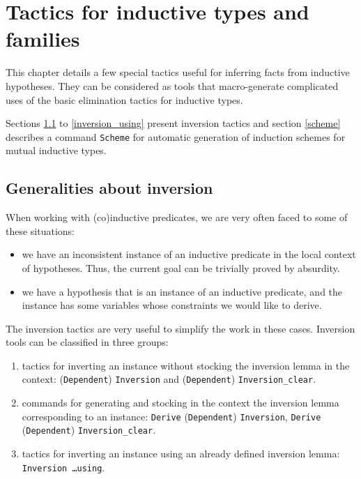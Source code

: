 
%

%

%


\chapter{Tactics for inductive types and families}
\label{Addoc-equality}

This chapter details a few special tactics useful for inferring facts
from inductive hypotheses. They can be considered as tools that
macro-generate complicated uses of the basic elimination tactics for
inductive types. 

Sections \ref{inversion_introduction} to \ref{inversion_using}  present
inversion tactics and section \ref{scheme} describes
a command {\tt Scheme} for automatic generation of induction schemes
for mutual inductive types.

%
%

%

\section{Generalities about inversion}
\label{inversion_introduction}
When working with (co)inductive predicates, we are very often faced to
some of these situations:
\begin{itemize}
\item we have an inconsistent instance of an inductive predicate in the
  local context of hypotheses. Thus, the current goal can be trivially
  proved by absurdity. 

\item we have a hypothesis that is an instance of an inductive
  predicate, and the instance has some variables whose constraints we
  would like to derive.
\end{itemize}

The inversion tactics are very useful to simplify the work in these
cases. Inversion tools can be classified in three groups:
\begin{enumerate}
\item tactics for inverting an instance without stocking the inversion
  lemma in the context: 
  (\texttt{Dependent})  \texttt{Inversion} and
 (\texttt{Dependent}) \texttt{Inversion\_clear}.
\item commands for generating and stocking in the context the inversion
  lemma corresponding to an instance: \texttt{Derive}
  (\texttt{Dependent}) \texttt{Inversion}, \texttt{Derive}
  (\texttt{Dependent}) \texttt{Inversion\_clear}.
\item tactics for inverting an instance using an already defined
  inversion lemma: \texttt{Inversion \ldots using}.
\end{enumerate}

